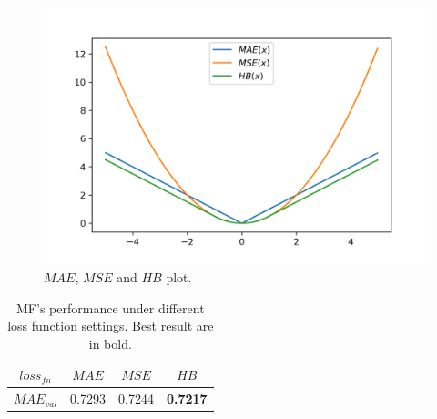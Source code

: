 \documentclass[journal, a4paper]{IEEEtran}
\begin{document}
\begin{figure}[!hbt]
	\begin{center}
		\includegraphics[width=\columnwidth]{loss_fns}
		\caption{$MAE$, $MSE$ and $HB$ plot.}
		\label{fig:loss_fns}
	\end{center}
\end{figure} \par

\begin{table}[!hbt]
	\begin{center}
		\caption{MF's performance under different loss function settings. Best result are in bold.}
		\label{tab:loss_mae}
		\begin{tabular}{|c|c|c|c|}
			\hline
			$loss_{fn}$  & $MAE$ & $MSE$ & $HB$  \\
			\hline
			$MAE_{val}$ & 0.7293 & 0.7244 & \textbf{0.7217} \\
			\hline
		\end{tabular}
	\end{center}
\end{table} \par
\end{document}

